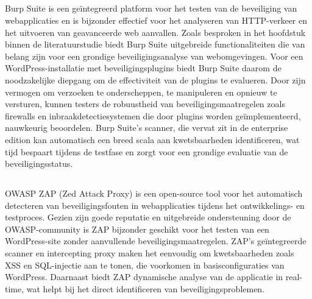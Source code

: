 \subsection{}
Burp Suite is een geïntegreerd platform voor het testen van de beveiliging van webapplicaties en is 
bijzonder effectief voor het analyseren van HTTP-verkeer en het uitvoeren van geavanceerde web 
aanvallen. Zoals besproken in het hoofdstuk  binnen de literatuurstudie 
biedt Burp Suite uitgebreide functionaliteiten die van belang zijn voor een grondige beveiligingsanalyse 
van webomgevingen. Voor een WordPress-installatie met beveiligingsplugins biedt Burp Suite daarom de noodzakelijke 
diepgang om de effectiviteit van de plugins te evalueren. Door zijn vermogen om verzoeken te 
onderscheppen, te manipuleren en opnieuw te versturen, kunnen testers de robuustheid van 
beveiligingsmaatregelen zoals firewalls en inbraakdetectiesystemen die door plugins worden 
geïmplementeerd, nauwkeurig beoordelen. Burp Suite's scanner, die vervat zit in de enterprise edition kan automatisch een breed scala 
aan kwetsbaarheden identificeren, wat tijd bespaart tijdens de testfase en zorgt voor een 
grondige evaluatie van de beveiligingsstatus.

\subsection{}
OWASP ZAP (Zed Attack Proxy) is een open-source tool voor het automatisch detecteren van beveiligingsfouten 
in webapplicaties tijdens het ontwikkelings- en testproces. Gezien zijn goede reputatie en uitgebreide 
ondersteuning door de OWASP-community is ZAP bijzonder geschikt voor het testen van een 
WordPress-site zonder aanvullende beveiligingsmaatregelen. ZAP's geïntegreerde scanner en 
intercepting proxy maken het eenvoudig om kwetsbaarheden zoals XSS en SQL-injectie aan te 
tonen, die voorkomen in basisconfiguraties van WordPress. Daarnaast biedt ZAP dynamische 
analyse van de applicatie in real-time, wat helpt bij het direct identificeren van beveiligingsproblemen.


\section{}

